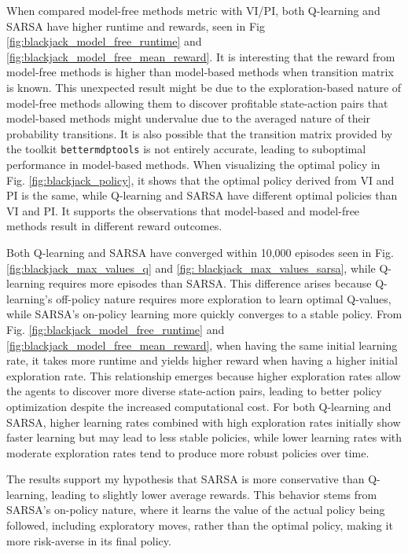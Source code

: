 \documentclass[conference]{IEEEtran}
\begin{document}
When compared model-free methods metric with VI/PI, both Q-learning and SARSA have higher runtime and rewards, seen in Fig \ref{fig:blackjack_model_free_runtime} and \ref{fig:blackjack_model_free_mean_reward}. It is interesting that the reward from model-free methods is higher than model-based methods when transition matrix is known. This unexpected result might be due to the exploration-based nature of model-free methods allowing them to discover profitable state-action pairs that model-based methods might undervalue due to the averaged nature of their probability transitions. It is also possible that the transition matrix provided by the toolkit \texttt{bettermdptools} is not entirely accurate, leading to suboptimal performance in model-based methods. When visualizing the optimal policy in Fig. \ref{fig:blackjack_policy}, it shows that the optimal policy derived from VI and PI is the same, while Q-learning and SARSA have different optimal policies than VI and PI. It supports the observations that model-based and model-free methods result in different reward outcomes.

Both Q-learning and SARSA have converged within 10,000 episodes seen in Fig. \ref{fig:blackjack_max_values_q} and \ref{fig: blackjack_max_values_sarsa}, while Q-learning requires more episodes than SARSA. This difference arises because Q-learning's off-policy nature requires more exploration to learn optimal Q-values, while SARSA's on-policy learning more quickly converges to a stable policy.
From Fig. \ref{fig:blackjack_model_free_runtime} and \ref{fig:blackjack_model_free_mean_reward}, when having the same initial learning rate, it takes more runtime and yields higher reward when having a higher initial exploration rate. This relationship emerges because higher exploration rates allow the agents to discover more diverse state-action pairs, leading to better policy optimization despite the increased computational cost. For both Q-learning and SARSA, higher learning rates combined with high exploration rates initially show faster learning but may lead to less stable policies, while lower learning rates with moderate exploration rates tend to produce more robust policies over time.

The results support my hypothesis that SARSA is more conservative than Q-learning, leading to slightly lower average rewards. This behavior stems from SARSA's on-policy nature, where it learns the value of the actual policy being followed, including exploratory moves, rather than the optimal policy, making it more risk-averse in its final policy.
\end{document}
